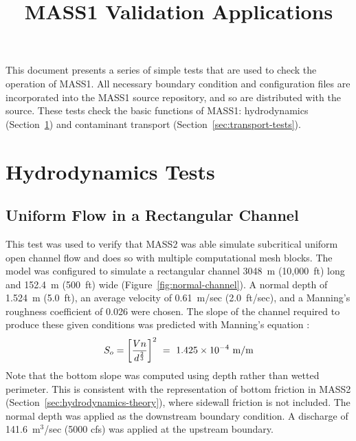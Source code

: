 \documentclass[12pt,dvips,letterpaper]{article}
\title{MASS1 Validation Applications}
\begin{document}
\maketitle{}
\tableofcontents{}

\vspace{0.5in}

This document presents a series of simple tests that are used to check
the operation of MASS1. All necessary boundary condition and
configuration files are incorporated into the MASS1 source
repository, and so are distributed with the source.  These tests
check the basic functions of  MASS1: hydrodynamics
(Section~\ref{sec:hydro-tests}) and contaminant transport
(Section~\ref{sec:transport-tests}).  

\section{Hydrodynamics Tests}
\label{sec:hydro-tests}


\subsection{Uniform Flow in a Rectangular Channel}
\label{sec:normal-flow}

This test was used to verify that MASS2 was able simulate 
subcritical uniform open channel flow and does so with multiple
computational mesh blocks.  The model was configured to simulate a
rectangular channel 3048~m (10,000~ft) long and 152.4~m (500~ft) wide
(Figure~\ref{fig:normal-channel}).  A normal depth of 1.524~m
(5.0~ft), an average velocity of 0.61~m/sec (2.0~ft/sec), and a Manning's
roughness coefficient of 0.026 were chosen.  The slope of the channel
required to produce these given conditions was predicted with
Manning's equation \citep{Chow59}:
\begin{displaymath}
  S_{o} = \left[ { V n } \over { d^{2 \over 3} } \right]^{2} ~ 
  = ~ 1.425 \times 10^{-4} ~ \textrm{m} \slash \textrm{m}
\end{displaymath}
Note that the bottom slope was computed using depth rather than
wetted perimeter.  This is consistent with the representation of
bottom friction in MASS2 (Section~\ref{sec:hydrodynamics-theory}),
where sidewall friction is not included.  The normal depth was applied
as the downstream boundary condition. A discharge of 141.6~m$^{3}$/sec
(5000 cfs) was applied at the upstream boundary.
\end{document}
